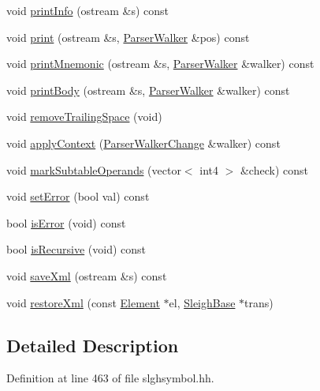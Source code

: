 \begin{DoxyCompactItemize}
\item 
void \mbox{\hyperlink{class_constructor_a2a0182b33c360d0d987a2ce62a5c8abe}{print\+Info}} (ostream \&s) const
\item 
void \mbox{\hyperlink{class_constructor_af054ebc974542915d6bba232796984d7}{print}} (ostream \&s, \mbox{\hyperlink{class_parser_walker}{Parser\+Walker}} \&pos) const
\item 
void \mbox{\hyperlink{class_constructor_a17546bf5169b175426f056051d491ecd}{print\+Mnemonic}} (ostream \&s, \mbox{\hyperlink{class_parser_walker}{Parser\+Walker}} \&walker) const
\item 
void \mbox{\hyperlink{class_constructor_a848fb41c8ca95cc49609e017f8934b59}{print\+Body}} (ostream \&s, \mbox{\hyperlink{class_parser_walker}{Parser\+Walker}} \&walker) const
\item 
void \mbox{\hyperlink{class_constructor_a4b6a4cd00ebf6d0e76f770e917e5ff72}{remove\+Trailing\+Space}} (void)
\item 
void \mbox{\hyperlink{class_constructor_ae5e916cdee72c2ecd8a4b1f52d61331a}{apply\+Context}} (\mbox{\hyperlink{class_parser_walker_change}{Parser\+Walker\+Change}} \&walker) const
\item 
void \mbox{\hyperlink{class_constructor_a3a9bcc286d18c9d05de32509c5d6f0c4}{mark\+Subtable\+Operands}} (vector$<$ int4 $>$ \&check) const
\item 
void \mbox{\hyperlink{class_constructor_aac13e041cf5506a141771c3c0ddac45a}{set\+Error}} (bool val) const
\item 
bool \mbox{\hyperlink{class_constructor_a7328fb79671921ab3366f5bd7a685c1e}{is\+Error}} (void) const
\item 
bool \mbox{\hyperlink{class_constructor_a367658054735fbf9901f4af537efeb38}{is\+Recursive}} (void) const
\item 
void \mbox{\hyperlink{class_constructor_a13e55da521f225ca03ce3237b9879e71}{save\+Xml}} (ostream \&s) const
\item 
void \mbox{\hyperlink{class_constructor_a67b635e452e41499c9962aaad9406781}{restore\+Xml}} (const \mbox{\hyperlink{class_element}{Element}} $\ast$el, \mbox{\hyperlink{class_sleigh_base}{Sleigh\+Base}} $\ast$trans)
\end{DoxyCompactItemize}


\subsection{Detailed Description}


Definition at line 463 of file slghsymbol.\+hh.



